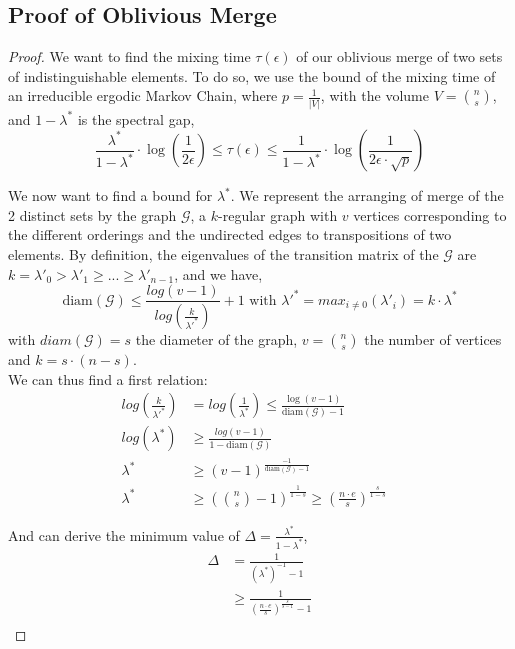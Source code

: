 \documentclass[USenglish,oneside,twocolumn]{article}
\begin{document}
\subsection{Proof of Oblivious Merge}\label{proof:OM}
\begin{proof}
We want to find the mixing time $\tau(\epsilon)$ of our oblivious merge of two sets of indistinguishable elements. To do so, we use the bound of the mixing time of an irreducible ergodic Markov Chain, where $p = \frac{1}{|V|}$, with the volume $V={n \choose s}$, and $1-\lambda^*$ is the spectral gap,
$$\frac{\lambda^*}{1-\lambda^*} \cdot \log\left(\frac{1}{2 \epsilon} \right)\leq \tau(\epsilon) \leq \frac{1}{1-\lambda^*}\cdot \log \left( \frac{1}{2 \epsilon \cdot \sqrt{p}}\right) $$

We now want to find a bound for $\lambda^*$. We represent the arranging of merge of the 2 distinct sets by the graph $\mathcal{G}$, a $k$-regular graph with $v$ vertices corresponding to the different orderings and the undirected edges to transpositions of two elements.
By definition, the eigenvalues of the transition matrix of the $\mathcal{G}$ are $k={\lambda'}_0 > {\lambda'}_1 \geq  ... \geq {\lambda'}_{n-1}$, and we have,
$$\text{diam}\left( \mathcal{G}\right) \leq \frac{log(v-1)}{log(\frac{k}{{\lambda'}^*})}+1 \text{ with } {\lambda'}^* = max_{i\neq0}({\lambda'}_i)= k \cdot \lambda^*$$
with $diam\left( \mathcal{G} \right)=s$ the diameter of the graph, $v= {n \choose s}$ the number of vertices and $k=s\cdot(n-s)$.\\


We can thus find a first relation:
\begin{align*}
log(\frac{k}{{\lambda'}^*}) &= log(\frac{1}{{\lambda}^*}) \leq\frac{\log(v-1)}{\text{diam}\left(\mathcal{G}\right)-1}&\\
log({{\lambda}^*}) &\geq  \frac{log(v-1)}{1-\text{diam}\left(\mathcal{G}\right)}&\\
{\lambda}^* &\geq (v-1)^{\frac{-1}{\text{diam}\left(\mathcal{G}\right)-1}}\\
{\lambda}^* &\geq \left ({n \choose s}-1 \right )^{\frac{1}{1-s}} \geq \left (\frac{n\cdot e}{s} \right )^{\frac{s}{1-s}}
\end{align*}

And can derive the minimum value of $\Delta=\frac{\lambda^*}{1-\lambda^*}$,
\begin{align*}
 \Delta &= \frac{1}{\left (\lambda^*\right )^{-1}-1}\\
 &\geq \frac{1}{\left (\frac{n \cdot e }{s} \right )^{\frac{s}{s-1}}-1}\\
\end{align*}



\end{proof}
\end{document}
